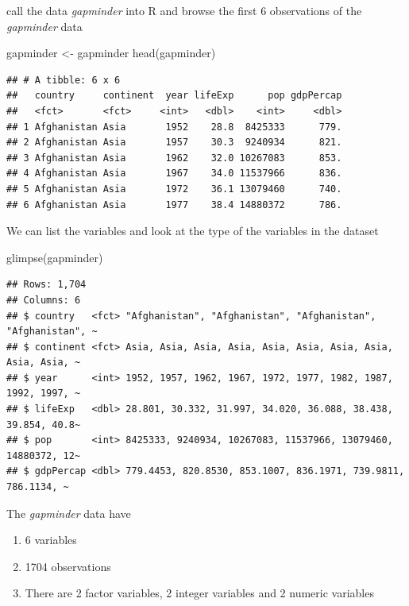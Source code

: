 \documentclass[
]{book}
\makeatletter
\newenvironment{Shaded}{\begin{snugshade}}{\end{snugshade}}
\newcommand{\FunctionTok}[1]{\textcolor[rgb]{0,0,0}{#1}}
\newcommand{\NormalTok}[1]{#1}
\newcommand{\OtherTok}[1]{\textcolor[rgb]{0.37,0.37,0.37}{#1}}
\providecommand{\tightlist}{%
  \setlength{\itemsep}{0pt}\setlength{\parskip}{0pt}}
\newenvironment{kframe}{%
\medskip{}
\setlength{\fboxsep}{.8em}
 \def\at@end@of@kframe{}%
 \ifinner\ifhmode%
  \def\at@end@of@kframe{\end{minipage}}%
  \begin{minipage}{\columnwidth}%
 \fi\fi%
 \def\FrameCommand##1{\hskip\@totalleftmargin \hskip-\fboxsep
 \colorbox{shadecolor}{##1}\hskip-\fboxsep
     \hskip-\linewidth \hskip-\@totalleftmargin \hskip\columnwidth}%
 \MakeFramed {\advance\hsize-\width
   \@totalleftmargin\z@ \linewidth\hsize
   \@setminipage}}%
 {\par\unskip\endMakeFramed%
 \at@end@of@kframe}
\renewenvironment{Shaded}{\begin{kframe}}{\end{kframe}}
\makeatother
\begin{document}
call the data \emph{gapminder} into R and browse the first 6 observations of the \emph{gapminder} data

\begin{Shaded}
\begin{Highlighting}[]
\NormalTok{gapminder }\OtherTok{\textless{}{-}}\NormalTok{ gapminder}
\FunctionTok{head}\NormalTok{(gapminder)}
\end{Highlighting}
\end{Shaded}

\begin{verbatim}
## # A tibble: 6 x 6
##   country     continent  year lifeExp      pop gdpPercap
##   <fct>       <fct>     <int>   <dbl>    <int>     <dbl>
## 1 Afghanistan Asia       1952    28.8  8425333      779.
## 2 Afghanistan Asia       1957    30.3  9240934      821.
## 3 Afghanistan Asia       1962    32.0 10267083      853.
## 4 Afghanistan Asia       1967    34.0 11537966      836.
## 5 Afghanistan Asia       1972    36.1 13079460      740.
## 6 Afghanistan Asia       1977    38.4 14880372      786.
\end{verbatim}

We can list the variables and look at the type of the variables in the dataset

\begin{Shaded}
\begin{Highlighting}[]
\FunctionTok{glimpse}\NormalTok{(gapminder)}
\end{Highlighting}
\end{Shaded}

\begin{verbatim}
## Rows: 1,704
## Columns: 6
## $ country   <fct> "Afghanistan", "Afghanistan", "Afghanistan", "Afghanistan", ~
## $ continent <fct> Asia, Asia, Asia, Asia, Asia, Asia, Asia, Asia, Asia, Asia, ~
## $ year      <int> 1952, 1957, 1962, 1967, 1972, 1977, 1982, 1987, 1992, 1997, ~
## $ lifeExp   <dbl> 28.801, 30.332, 31.997, 34.020, 36.088, 38.438, 39.854, 40.8~
## $ pop       <int> 8425333, 9240934, 10267083, 11537966, 13079460, 14880372, 12~
## $ gdpPercap <dbl> 779.4453, 820.8530, 853.1007, 836.1971, 739.9811, 786.1134, ~
\end{verbatim}

The \emph{gapminder} data have

\begin{enumerate}
\def\labelenumi{\arabic{enumi}.}
\tightlist
\item
  6 variables
\item
  1704 observations
\item
  There are 2 factor variables, 2 integer variables and 2 numeric variables
\end{enumerate}
\end{document}

